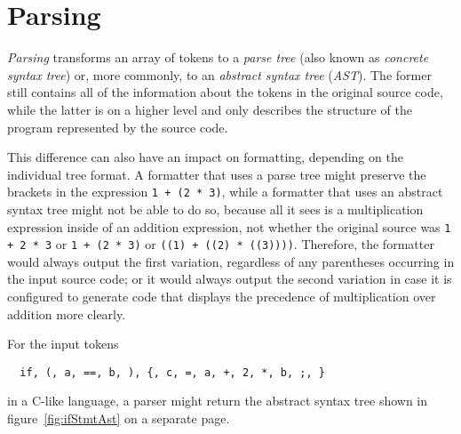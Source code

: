 \section{Parsing}
\textit{Parsing} transforms an array of tokens to a \textit{parse tree} (also known as
\textit{concrete syntax tree}) or, more commonly, to an \textit{abstract syntax tree} (\textit{AST}).
The former still contains all of the information about the tokens in the original source code,
while the latter is on a higher level and only describes
the structure of the program represented by the source code.

This difference can also have an impact on formatting, depending on the individual tree format.
A formatter that uses a parse tree might preserve the brackets in the expression
\texttt{1 + (2 * 3)}, while a formatter that uses an abstract syntax tree might
not be able to do so, because all it sees is a multiplication expression inside of an addition expression,
not whether the original source was \texttt{1 + 2 * 3} or \texttt{1 + (2 * 3)}
or \texttt{((1) + ((2) * ((3))))}.
Therefore, the formatter would always output the first variation,
regardless of any parentheses occurring in the input source code;
or it would always output the second variation in case it is configured to generate code
that displays the precedence of multiplication over addition more clearly.

For the input tokens
\begin{verbatim}
  if, (, a, ==, b, ), {, c, =, a, +, 2, *, b, ;, }
\end{verbatim}
in a C-like language, a parser might return the abstract syntax tree
shown in figure~\ref{fig:ifStmtAst} on a separate page.

